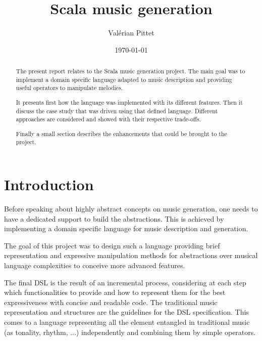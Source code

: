 \documentclass[twocolumn, 11pt]{article}
\begin{document}
\newcommand{\lln}[1]{
  \lstinline@#1@
}

\title{Scala music generation}
\author{Val\'erian Pittet}
\date{\today}

\onecolumn

\maketitle
\begin{abstract}

The present report relates to the Scala music generation project. The main goal was to implement a domain specific language adapted to music description and providing useful operators to manipulate melodies.

It presents first how the language was implemented with its different features.
Then it discuss the case study that was driven using that defined language. Different approaches are considered and showed with their respective trade-offs.

Finally a small section describes the enhancements that could be brought to the project.


\end{abstract}
\tableofcontents

\twocolumn
\section{Introduction}

Before speaking about highly abstract concepts on music generation, one needs to have a dedicated support to build the abstractions.
This is achieved by implementing a domain specific language for music description and generation.

The goal of this project was to design such a language providing brief representation and expressive manipulation methods
for abstractions over musical language complexities to conceive more advanced features.

The final DSL is the result of an incremental process, considering at each step which functionalities to provide and how to represent them for the best expressiveness with concise and readable code.
The traditional music representation and structures are the guidelines for the DSL specification. This comes to a language representing all the element entangled in traditional music (as tonality, rhythm, ...) independently and combining them by simple operators.

\end{document}
